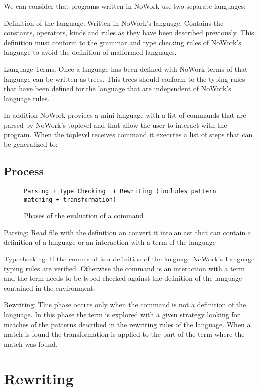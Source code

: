 \documentclass[12pt,a4paper]{article}
\begin{document}
We can consider that programs written in NoWork use two separate languages:

Definition of the language. Written in NoWork's language. Contains the
constants, operators, kinds and rules as they have been described
previously. This definition must conform to the grammar and type
checking rules of NoWork's language to avoid the definition of
malformed languages.

Language Terms. Once a language has been defined with NoWork terms of
that language can be written as trees. This trees should conform to the
typing rules that have been defined for the language that are
independent of NoWork's language rules.

In addition NoWork provides a mini-language with a list of commands that are parsed by
NoWork's toplevel and that allow the user to interact with the
program. When the toplevel receives command it executes a list of
steps that can be generalized to:

\subsection{Process}

\begin{figure}[!h]
\begin{verbatim}
Parsing + Type Checking  + Rewriting (includes pattern matching + transformation)
\end{verbatim}
\caption{ Phases of the evaluation of a command }
\end{figure}

Parsing: Read file with the definition an convert it into an ast that
can contain a definition of a language or an interaction with a term
of the language

Typechecking: If the command is a definition of the language NoWork's
Language typing rules are verified. Otherwise the command is an interaction with a
term and the term needs to be typed checked against the definition of
the language contained in the environment.

Rewriting: This phase occurs only when the command is not a definition
of the language. In this phase the term is explored with a
given strategy looking for matches of the patterns described in the
rewriting rules of the language. When a match is found the
transformation is applied to the part of the term where the match
was found.

\section{Rewriting}
\end{document}
